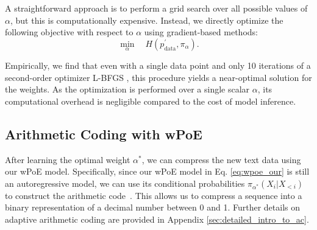 \documentclass[11pt]{article}
\begin{document}
A straightforward approach is to perform a grid search over all possible values of \({\alpha}\), but this is computationally expensive. 
Instead, we directly optimize the following objective with respect to \({\alpha}\) using gradient-based methods:
\begin{equation}
\min_{{\alpha}} \quad H(p_{\text{data}}^{\prime},\pi_{{\alpha}} ).
\end{equation}

Empirically, we find that even with a single data point and only 10 iterations of a second-order optimizer L-BFGS \cite{lbfgs}, this procedure yields a near-optimal solution for the weights. 
As the optimization is performed over a single scalar \(\alpha\), its computational overhead is negligible compared to the cost of model inference.


\subsection{Arithmetic Coding with wPoE}
After learning the optimal weight \(\alpha^{\ast}\), we can compress the new text data using our wPoE model.
Specifically, since our wPoE model in Eq. \eqref{eq:wpoe_our} is still an autoregressive model, we can use its conditional probabilities \(\pi_{\alpha^{\ast}}\!(X_i \vert X_{<i})\) to construct the arithmetic code~\citep{pasco1977source, rissanen1976generalized}.
This allows us to compress a sequence into a binary representation of a decimal number between 0 and 1.
Further details on adaptive arithmetic coding are provided in Appendix \ref{sec:detailed_intro_to_ac}.
   
\end{document}
